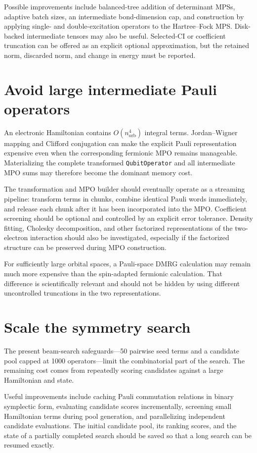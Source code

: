 \documentclass[11pt]{article}
\begin{document}
Possible improvements include balanced-tree addition of determinant MPSs,
adaptive batch sizes, an intermediate bond-dimension cap, and construction by
applying single- and double-excitation operators to the Hartree--Fock MPS.
Disk-backed intermediate tensors may also be useful.  Selected-CI or
coefficient truncation can be offered as an explicit optional approximation,
but the retained norm, discarded norm, and change in energy must be reported.

\section{Avoid large intermediate Pauli operators}

An electronic Hamiltonian contains $O(n_{\mathrm{orb}}^4)$ integral terms.
Jordan--Wigner mapping and Clifford conjugation can make the explicit Pauli
representation expensive even when the corresponding fermionic MPO remains
manageable.  Materializing the complete transformed \texttt{QubitOperator}
and all intermediate MPO sums may therefore become the dominant memory cost.

The transformation and MPO builder should eventually operate as a streaming
pipeline: transform terms in chunks, combine identical Pauli words
immediately, and release each chunk after it has been incorporated into the
MPO.  Coefficient screening should be optional and controlled by an explicit
error tolerance.  Density fitting, Cholesky decomposition, and other
factorized representations of the two-electron interaction should also be
investigated, especially if the factorized structure can be preserved during
MPO construction.

For sufficiently large orbital spaces, a Pauli-space DMRG calculation may
remain much more expensive than the spin-adapted fermionic calculation.  That
difference is scientifically relevant and should not be hidden by using
different uncontrolled truncations in the two representations.

\section{Scale the symmetry search}

The present beam-search safeguards---50 pairwise seed terms and a candidate
pool capped at 1000 operators---limit the combinatorial part of the search.
The remaining cost comes from repeatedly scoring candidates against a large
Hamiltonian and state.

Useful improvements include caching Pauli commutation relations in binary
symplectic form, evaluating candidate scores incrementally, screening small
Hamiltonian terms during pool generation, and parallelizing independent
candidate evaluations.  The initial candidate pool, its ranking scores, and
the state of a partially completed search should be saved so that a long
search can be resumed exactly.
\end{document}
